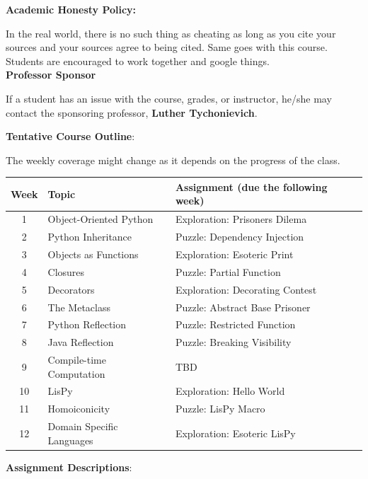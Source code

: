 \documentclass[11pt]{article}
\begin{document}
\textbf {\large Academic Honesty Policy:} 

In the real world, there is no such thing as cheating as long as you cite your sources and your sources agree to being cited. Same goes with this course. Students are encouraged to work together and google things. 
\\

\textbf {\large Professor Sponsor}

If a student has an issue with the course, grades, or instructor, he/she may contact the sponsoring professor, \textbf{Luther Tychonievich}.

\newpage
\textbf {\large Tentative Course Outline}:

The weekly coverage might change as it depends on the progress of the class. 

\begin{center}
\begin{tabular}{c | l | l}
\textbf{Week} & \textbf{Topic} & \textbf{Assignment} (due the following week)  \\
\hline 1 & Object-Oriented Python  & Exploration: Prisoners Dilema \\
2 & Python Inheritance & Puzzle: Dependency Injection \\
3 & Objects as Functions & Exploration: Esoteric Print  \\
4 & Closures & Puzzle: Partial Function\\
5 & Decorators & Exploration: Decorating Contest\\
6 & The Metaclass &  Puzzle: Abstract Base Prisoner\\
7 & Python Reflection & Puzzle: Restricted Function \\
8 & Java Reflection & Puzzle: Breaking Visibility \\
9 & Compile-time Computation & TBD \\
10 & LisPy &  Exploration: Hello World\\
11 & Homoiconicity &  Puzzle: LisPy Macro\\
12 & Domain Specific Languages &  Exploration: Esoteric LisPy
\end{tabular}
\end{center}

\vspace{10mm}

\textbf {\large Assignment Descriptions}:
\end{document}
